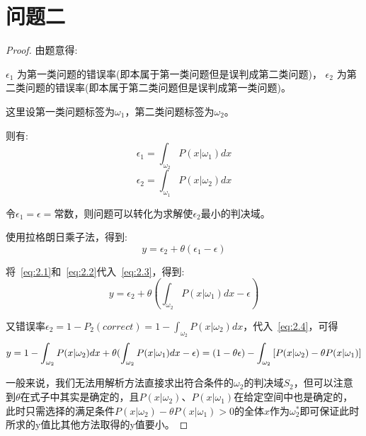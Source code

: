 \documentclass[UTF8]{article} %
\begin{document}
    \section{问题二}
    \begin{proof}

        由题意得:

        $\epsilon_1$ 为第一类问题的错误率(即本属于第一类问题但是误判成第二类问题)， $\epsilon_2$ 为第二类问题的错误率(即本属于第二类问题但是误判成第一类问题)。

        这里设第一类问题标签为$\omega_1$，第二类问题标签为$\omega_2$。

        则有:
        \begin{equation}
            \epsilon_1 = \int_{\omega_2} P(x|\omega_1)dx \label{eq:2.1}
        \end{equation}
        \begin{equation}
            \epsilon_2 = \int_{\omega_1} P(x|\omega_2)dx \label{eq:2.2}
        \end{equation}

        令$\epsilon_1 = \epsilon = \text{常数}$，则问题可以转化为求解使$\epsilon_2$最小的判决域。

        使用拉格朗日乘子法，得到:
        \begin{equation}
            y = \epsilon_2 + \theta(\epsilon_1 - \epsilon) \label{eq:2.3}
        \end{equation}

        将~\eqref{eq:2.1}和~\eqref{eq:2.2}代入~\eqref{eq:2.3}，得到:
        \begin{equation}
            y = \epsilon_2 + \theta(\int_{\omega_2} P(x|\omega_1)dx - \epsilon) \label{eq:2.4}
        \end{equation}

        又错误率$\epsilon_2 = 1 - P_2(correct) = 1 - \int_{\omega_2} P(x|\omega_2)dx$，代入~\eqref{eq:2.4}，可得
        \begin{equation}
            y = 1 - \int_{\omega_2} P(x|\omega_2)dx + \theta(\int_{\omega_2} P(x|\omega_1)dx - \epsilon) \newline
            = (1 - \theta \epsilon) - \int_{\omega_2} \left[ P(x|\omega_2) - \theta P(x|\omega_1) \right]\label{eq:2.5}
        \end{equation}

        一般来说，我们无法用解析方法直接求出符合条件的$\omega_2$的判决域$S_2$，但可以注意到$\theta$在式子中其实是确定的，且$P(x|\omega_2)$、$P(x|\omega_1)$在给定空间中也是确定的，此时只需选择的满足条件$P(x|\omega_2) - \theta P(x|\omega_1) > 0$的全体$x$作为$\omega_2^{*}$即可保证此时所求的y值比其他方法取得的y值要小。


\end{proof}
\end{document}
